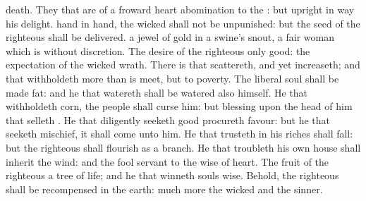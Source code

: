 {death.
They that are of a
froward
heart
{}
abomination to the
{}: but
{}
upright in
{}
way
{} his
delight.
hand
{} in
hand, the
wicked shall not be
unpunished: but the
seed of the
righteous shall be
delivered.
 a
jewel of
gold in a
swine’s
snout,
{} a
fair
woman which is
without
discretion.
The
desire of the
righteous
{} only
good:
{} the
expectation of the
wicked
{}
wrath.
There
is that
scattereth, and yet
increaseth; and
{} that
withholdeth more than is
meet, but
{} to
poverty.
The
liberal
soul shall be made
fat: and he that
watereth shall be
watered also himself.
He that
withholdeth
corn, the
people shall
curse him: but
blessing
{} upon the
head of him that
selleth
{}.
He that diligently
seeketh
good
procureth
favour: but he that
seeketh
mischief, it shall
come unto him.
He that
trusteth in his
riches shall
fall: but the
righteous shall
flourish as a
branch.
He that
troubleth his own
house shall
inherit the
wind: and the
fool
{}
servant to the
wise of
heart.
The
fruit of the
righteous
{} a
tree of
life; and he that
winneth
souls
{}
wise.
Behold, the
righteous shall be
recompensed in the
earth: much more the
wicked and the
sinner.

}
